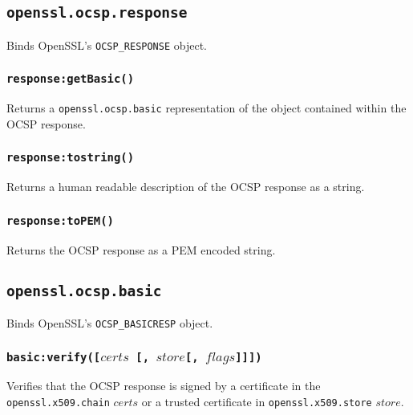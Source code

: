 \documentclass[11pt, oneside]{memoir}
\newcommand*{\fn}[1]{\texttt{#1}\xspace}
\newcommand*{\module}[1]{\texttt{#1}\xspace}
\newcounter{toccols}
\newenvironment{Module}[1]{
	\subsection{\texttt{#1}}
	\addtocontents{toc}{
		\protect\begin{multicols}{\value{toccols}}
	}
}{
	\addtocontents{toc}{\protect\end{multicols}}
}
\begin{document}
\begin{Module}{openssl.ocsp.response}

Binds OpenSSL's \texttt{OCSP\_RESPONSE} object.

\subsubsection[\fn{response:getBasic}]{\fn{response:getBasic()}}

Returns a \module{openssl.ocsp.basic} representation of the object contained within the OCSP response.

\subsubsection[\fn{response:tostring}]{\fn{response:tostring()}}

Returns a human readable description of the OCSP response as a string.

\subsubsection[\fn{response:toPEM}]{\fn{response:toPEM()}}

Returns the OCSP response as a PEM encoded string.

\end{Module}


\begin{Module}{openssl.ocsp.basic}

Binds OpenSSL's \texttt{OCSP\_BASICRESP} object.

\subsubsection[\fn{basic:verify}]{\fn{basic:verify([$certs$ [, $store$[, $flags$]]])}}

Verifies that the OCSP response is signed by a certificate in the \module{openssl.x509.chain} $certs$ or a trusted certificate in \module{openssl.x509.store} $store$.

\end{Module}
\end{document}
